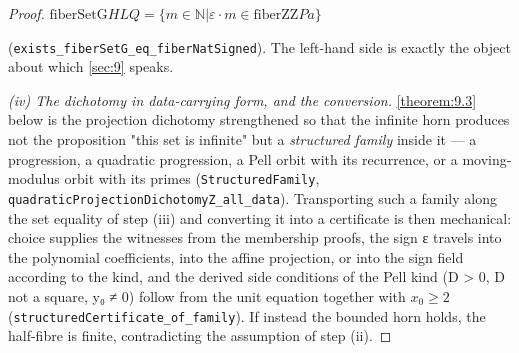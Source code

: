 \begin{proof}
$\mathrm{fiberSetG} H L Q = \{m ∈ ℕ | ε·m ∈ \mathrm{fiberZZ} P a\}$

(\texttt{exists\_\allowbreak{}fiberSetG\_\allowbreak{}eq\_\allowbreak{}fiberNatSigned}). The left-hand side is exactly the object about which \cref{sec:9} speaks.

\emph{(iv) The dichotomy in data-carrying form, and the conversion.} \cref{theorem:9.3} below is the projection dichotomy strengthened so that the infinite horn produces not the proposition "this set is infinite" but a \emph{structured family} inside it — a progression, a quadratic progression, a Pell orbit with its recurrence, or a moving-modulus orbit with its primes (\texttt{StructuredFamily}, \texttt{quadraticProjectionDichotomyZ\_\allowbreak{}all\_\allowbreak{}data}). Transporting such a family along the set equality of step (iii) and converting it into a certificate is then mechanical: choice supplies the witnesses from the membership proofs, the sign ε travels into the polynomial coefficients, into the affine projection, or into the sign field according to the kind, and the derived side conditions of the Pell kind (D > 0, D not a square, y₀ ≠ 0) follow from the unit equation together with $x_{0} ≥ 2$ (\texttt{structuredCertificate\_\allowbreak{}of\_\allowbreak{}family}). If instead the bounded horn holds, the half-fibre is finite, contradicting the assumption of step (ii).

\end{proof}
